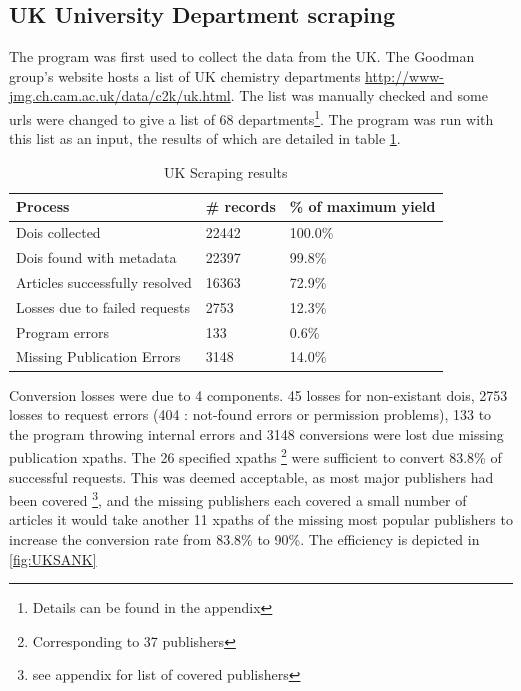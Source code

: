 \subsection{UK University Department scraping}
\label{sec:UKSCRAPE}
The program was first used to collect the data from the UK. The Goodman group's website hosts a list of UK chemistry departments \url{http://www-jmg.ch.cam.ac.uk/data/c2k/uk.html}. The list was manually checked and some urls were changed to give a list of 68 departments\footnote{Details can be found in the appendix}. The program was run with this list as an input, the results of which are detailed in table \ref{tab:UKSCRAPERES}.
\begin{table}[h!]
\label{tab:UKSCRAPERES}
\caption{UK Scraping results}
\begin{center}
\begin{tabular}{||l|l|l||}
\hline
Process & \# records & \% of maximum yield\\
\hline
Dois collected & 22442 & 100.0\%\\
Dois found with metadata & 22397 & 99.8\%\\
Articles successfully resolved & 16363 & 72.9\%\\
Losses due to failed requests & 2753 & 12.3\%\\
Program errors & 133 & 0.6\%\\
Missing Publication Errors & 3148 & 14.0\% \\
\hline
\end{tabular}
\end{center}
\end{table}
Conversion losses were due to 4 components. 45 losses for non-existant dois,  2753 losses to request errors (404 : not-found errors or permission problems), 133 to the program throwing internal errors and 3148 conversions were lost due missing publication xpaths. The 26 specified xpaths \footnote{Corresponding to 37 publishers} were sufficient to convert 83.8\% of successful requests. This was deemed acceptable, as most major publishers had been covered \footnote{see appendix for list of covered publishers}, and the missing publishers each covered a small number of articles it would take another 11 xpaths of the missing most popular publishers to increase the conversion rate from 83.8\% to 90\%.
The efficiency is depicted in \ref{fig:UKSANK}

